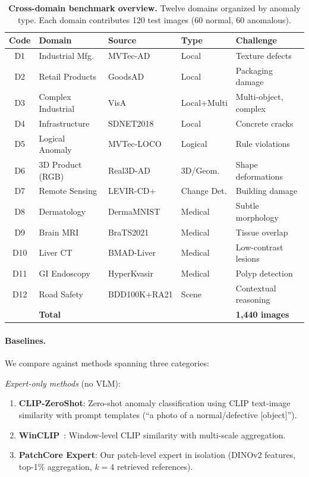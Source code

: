 \begin{table}[t]
\centering
\caption{%
    \textbf{Cross-domain benchmark overview.}
    Twelve domains organized by anomaly type.
    Each domain contributes 120 test images (60 normal, 60 anomalous).
}
\label{tab:benchmark}
\small
\setlength{\tabcolsep}{3pt}
\begin{tabular}{@{}clllp{3.0cm}@{}}
\toprule
Code & Domain & Source & Type & Challenge \\
\midrule
D1  & Industrial Mfg.    & MVTec-AD    & Local      & Texture defects \\
D2  & Retail Products    & GoodsAD     & Local      & Packaging damage \\
D3  & Complex Industrial & VisA        & Local+Multi & Multi-object, complex \\
D4  & Infrastructure     & SDNET2018   & Local      & Concrete cracks \\
D5  & Logical Anomaly    & MVTec-LOCO  & Logical    & Rule violations \\
D6  & 3D Product (RGB)   & Real3D-AD   & 3D/Geom.   & Shape deformations \\
D7  & Remote Sensing     & LEVIR-CD+   & Change Det. & Building damage \\
D8  & Dermatology        & DermaMNIST  & Medical    & Subtle morphology \\
D9  & Brain MRI          & BraTS2021   & Medical    & Tissue overlap \\
D10 & Liver CT           & BMAD-Liver  & Medical    & Low-contrast lesions \\
D11 & GI Endoscopy       & HyperKvasir & Medical    & Polyp detection \\
D12 & Road Safety        & BDD100K+RA21 & Scene     & Contextual reasoning \\
\midrule
    & \textbf{Total}           &                   &                      & \textbf{1{,}440 images} \\
\bottomrule
\end{tabular}
\end{table}

\paragraph{Baselines.}
We compare against methods spanning three categories:

\emph{Expert-only methods} (no VLM):
\begin{enumerate}[leftmargin=*,itemsep=1pt]
    \item \textbf{CLIP-ZeroShot}: Zero-shot anomaly classification using CLIP text-image similarity with prompt templates (``a photo of a normal/defective [object]'').
    \item \textbf{WinCLIP}~\citep{jeong2023winclip}: Window-level CLIP similarity with multi-scale aggregation.
    \item \textbf{PatchCore Expert}: Our patch-level expert in isolation (DINOv2 features, top-1\% aggregation, $k{=}4$ retrieved references).
\end{enumerate}

